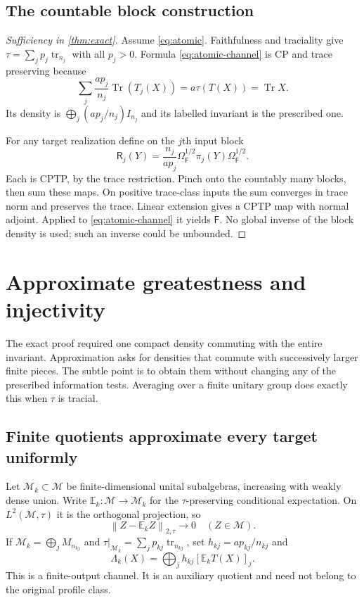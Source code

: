 \documentclass[11pt,reqno]{amsart}
\theoremstyle{definition}
\theoremstyle{remark}
\numberwithin{equation}{section}
\DeclareMathOperator{\Tr}{Tr}
\newcommand{\M}{\mathcal M}
\newcommand{\tr}{\operatorname{tr}}
\newcommand{\F}{\mathsf F}
\newcommand{\R}{\mathsf R}
\newcommand{\norm}[1]{\left\lVert#1\right\rVert}
\begin{document}
\subsection{The countable block construction}

\begin{proof}[Sufficiency in \cref{thm:exact}]
Assume \eqref{eq:atomic}. Faithfulness and traciality give $\tau=\sum_jp_j\tr_{n_j}$ with all $p_j>0$. Formula \eqref{eq:atomic-channel} is CP and trace preserving because
\[
 \sum_j\frac{ap_j}{n_j}\Tr(T_j(X))=a\tau(T(X))=\Tr X.
\]
Its density is $\bigoplus_j(ap_j/n_j)I_{n_j}$ and its labelled invariant is the prescribed one.

For any target realization define on the $j$th input block
\[
 \R_j(Y)=\frac{n_j}{ap_j}\Omega_\F^{1/2}\pi_j(Y)\Omega_\F^{1/2}.
\]
Each is CPTP, by the trace restriction. Pinch onto the countably many blocks, then sum these maps. On positive trace-class inputs the sum converges in trace norm and preserves the trace. Linear extension gives a CPTP map with normal adjoint. Applied to \eqref{eq:atomic-channel} it yields $\F$. No global inverse of the block density is used; such an inverse could be unbounded.
\end{proof}



\section{Approximate greatestness and injectivity}\label{sec:approximate}

The exact proof required one compact density commuting with the entire invariant. Approximation asks for densities that commute with successively larger finite pieces. The subtle point is to obtain them without changing any of the prescribed information tests. Averaging over a finite unitary group does exactly this when $\tau$ is tracial.

\subsection{Finite quotients approximate every target uniformly}

Let $\M_k\subset\M$ be finite-dimensional unital subalgebras, increasing with weakly dense union. Write $\mathbb E_k:\M\to\M_k$ for the $\tau$-preserving conditional expectation. On $L^2(\M,\tau)$ it is the orthogonal projection, so
\begin{equation}\label{eq:L2-convergence}
 \norm{Z-\mathbb E_kZ}_{2,\tau}\longrightarrow0
 \quad(Z\in\M).
\end{equation}
If $\M_k=\bigoplus_jM_{n_{kj}}$ and $\tau|_{\M_k}=\sum_jp_{kj}\tr_{n_{kj}}$, set $h_{kj}=ap_{kj}/n_{kj}$ and
\begin{equation}\label{eq:external-lift}
 \Lambda_k(X)=\bigoplus_j h_{kj}[\mathbb E_kT(X)]_j.
\end{equation}
This is a finite-output channel. It is an auxiliary quotient and need not belong to the original profile class.
\end{document}
